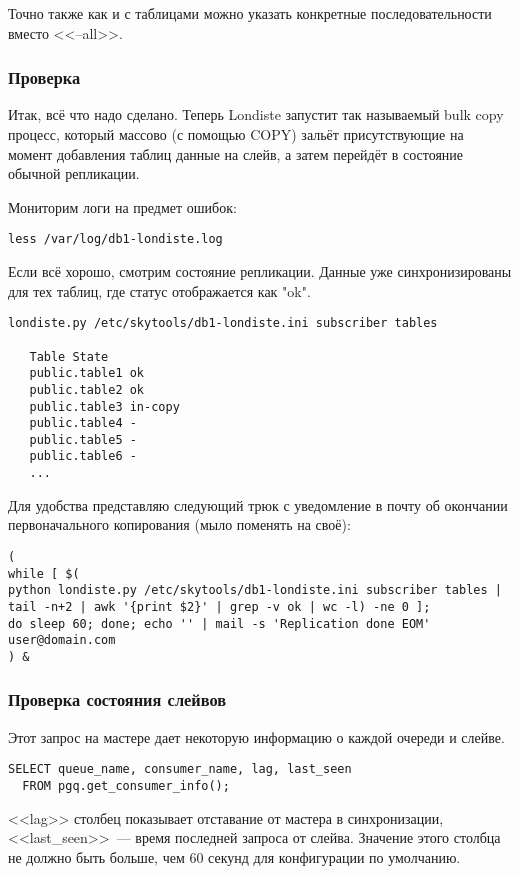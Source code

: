 Точно также как и с таблицами можно указать конкретные последовательности вместо <<--all>>.

\subsubsection{Проверка}
Итак, всё что надо сделано. Теперь Londiste запустит так называемый bulk copy
процесс, который массово (с помощью COPY) зальёт присутствующие на момент
добавления таблиц данные на слейв, а затем перейдёт в состояние обычной репликации.

Мониторим логи на предмет ошибок:
\begin{verbatim}
less /var/log/db1-londiste.log
\end{verbatim}

Если всё хорошо, смотрим состояние репликации. Данные уже синхронизированы для
тех таблиц, где статус отображается как "ok".
\begin{verbatim}
londiste.py /etc/skytools/db1-londiste.ini subscriber tables

   Table State
   public.table1 ok
   public.table2 ok
   public.table3 in-copy
   public.table4 -
   public.table5 -
   public.table6 -
   ...
\end{verbatim}

Для удобства представляю следующий трюк с уведомление в почту об окончании
первоначального копирования (мыло поменять на своё):
\begin{verbatim}
(
while [ $(
python londiste.py /etc/skytools/db1-londiste.ini subscriber tables |
tail -n+2 | awk '{print $2}' | grep -v ok | wc -l) -ne 0 ];
do sleep 60; done; echo '' | mail -s 'Replication done EOM' user@domain.com
) &
\end{verbatim}

\subsubsection{Проверка состояния слейвов}
Этот запрос на мастере дает некоторую информацию о каждой очереди и слейве.
\begin{verbatim}
SELECT queue_name, consumer_name, lag, last_seen
  FROM pgq.get_consumer_info();
\end{verbatim}

<<lag>> столбец показывает отставание от мастера в синхронизации, 
<<last\_seen>>~--- время последней запроса от слейва. Значение этого столбца не должно быть больше, 
чем 60 секунд для конфигурации по умолчанию.